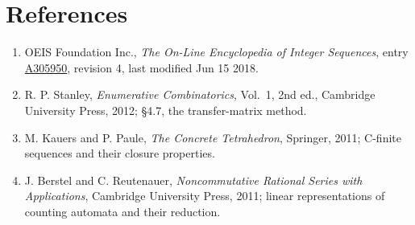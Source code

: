 \documentclass[11pt]{article}
\theoremstyle{definition}
\begin{document}
\section{References}

\begin{enumerate}

\item OEIS Foundation Inc., \emph{The On-Line Encyclopedia of Integer Sequences}, entry \href{https://oeis.org/A305950}{A305950}, revision 4, last modified Jun 15 2018.

\item R. P. Stanley, \emph{Enumerative Combinatorics}, Vol.~1, 2nd ed., Cambridge University Press, 2012; \S4.7, the transfer-matrix method.

\item M. Kauers and P. Paule, \emph{The Concrete Tetrahedron}, Springer, 2011; C-finite sequences and their closure properties.

\item J. Berstel and C. Reutenauer, \emph{Noncommutative Rational Series with Applications}, Cambridge University Press, 2011; linear representations of counting automata and their reduction.

\end{enumerate}
\end{document}

